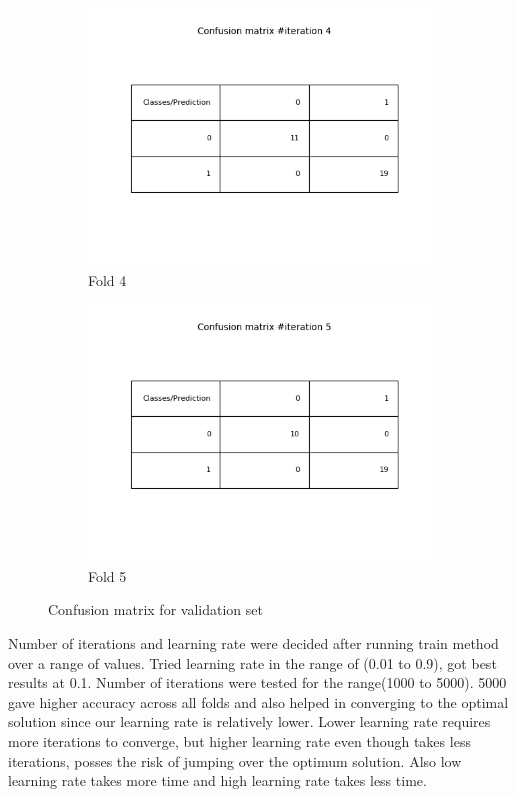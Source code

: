 \documentclass[11pt]{scrartcl}
\begin{document}
\begin{enumerate}
\begin{figure}[h!]
\begin{subfigure}[b]{0.4\linewidth}
					\includegraphics[width=\linewidth]{confusionMatrix4.png}
					\caption{Fold 4}
				\end{subfigure}
				\begin{subfigure}[b]{0.4\linewidth}
					\includegraphics[width=\linewidth]{confusionMatrix5.png}
					\caption{Fold 5}
				\end{subfigure}
				\caption{Confusion matrix for validation set}
			\end{figure}	
	\end{enumerate}
	Number of iterations and learning rate were decided after running train method over a range of values. Tried learning rate in the range of (0.01 to 0.9), got best results at 0.1. Number of iterations were tested for the range(1000 to 5000). 5000 gave higher accuracy across all folds and also helped in converging to the optimal solution since our learning rate is relatively lower. Lower learning rate requires more iterations to converge, but higher learning rate even though takes less iterations, posses the risk of jumping over the optimum solution. Also low learning rate takes more time and high learning rate takes less time.
	
\end{document}
